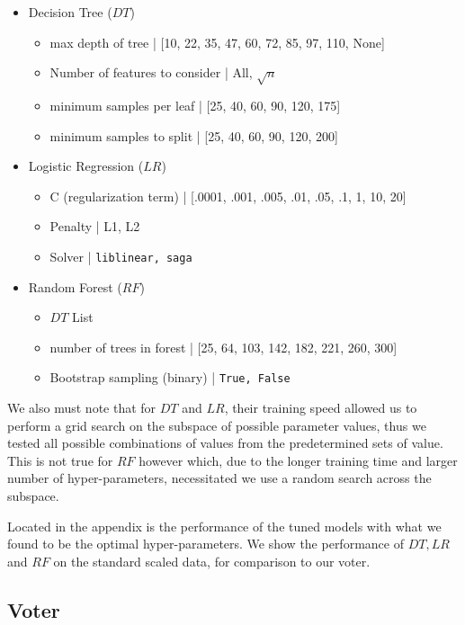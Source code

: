 \documentclass[12pt, a4paper]{article} %
\begin{document}
\begin{itemize}
	\item Decision Tree ($DT$)
    	\begin{itemize}
    	\item max depth of tree | [10, 22, 35, 47, 60, 72, 85, 97, 110, None]
    	\item Number of features to consider | All, $\sqrt{n}$
    	\item minimum samples per leaf | [25, 40, 60, 90, 120, 175]
    	\item minimum samples to split | [25, 40, 60, 90, 120, 200]
    	\end{itemize}
	\item Logistic Regression ($LR$)
	    \begin{itemize}
    	\item C (regularization term) | [.0001, .001, .005, .01, .05, .1, 1, 10, 20]
    	\item Penalty | L1, L2
    	\item Solver | {\tt liblinear, saga}
    	\end{itemize}
	\item Random Forest ($RF$)
	    \begin{itemize}
    	\item $DT$ List
    	\item number of trees in forest | [25, 64, 103, 142, 182, 221, 260, 300]
    	\item Bootstrap sampling (binary) | {\tt True, False}
    	\end{itemize}
\end{itemize}

We also must note that for $DT$ and $LR$, their training speed allowed us to perform a grid search on the subspace of possible parameter values, thus we tested all possible combinations of values from the predetermined sets of value. This is not true for $RF$ however which, due to the longer training time and larger number of hyper-parameters, necessitated we use a random search across the subspace. 

Located in the appendix is the performance of the tuned models with what we found to be the optimal hyper-parameters. We show the performance of $DT, LR$ and $RF$ on the standard scaled data, for comparison to our voter.

\subsection{Voter}
\end{document}

